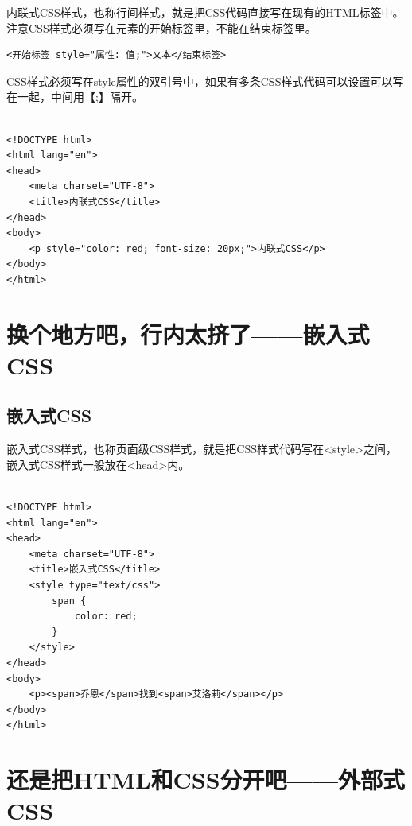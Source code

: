 内联式CSS样式，也称行间样式，就是把CSS代码直接写在现有的HTML标签中。注意CSS样式必须写在元素的开始标签里，不能在结束标签里。\\

\begin{lstlisting}[style=htmlcssjs]
<开始标签 style="属性: 值;">文本</结束标签>
\end{lstlisting}

CSS样式必须写在style属性的双引号中，如果有多条CSS样式代码可以设置可以写在一起，中间用【;】隔开。\\

\\

\begin{lstlisting}[style=htmlcssjs]
<!DOCTYPE html>
<html lang="en">
<head>
    <meta charset="UTF-8">
    <title>内联式CSS</title>
</head>
<body>
    <p style="color: red; font-size: 20px;">内联式CSS</p>
</body>
</html>
\end{lstlisting}

\newpage

\section{换个地方吧，行内太挤了——嵌入式CSS}

\subsection{嵌入式CSS}

嵌入式CSS样式，也称页面级CSS样式，就是把CSS样式代码写在<style>之间，嵌入式CSS样式一般放在<head>内。\\

\\

\begin{lstlisting}[style=htmlcssjs]
<!DOCTYPE html>
<html lang="en">
<head>
    <meta charset="UTF-8">
    <title>嵌入式CSS</title>
    <style type="text/css">
        span {
            color: red;
        }
    </style>
</head>
<body>
    <p><span>乔恩</span>找到<span>艾洛莉</span></p>
</body>
</html>
\end{lstlisting}

\newpage

\section{还是把HTML和CSS分开吧——外部式CSS}

